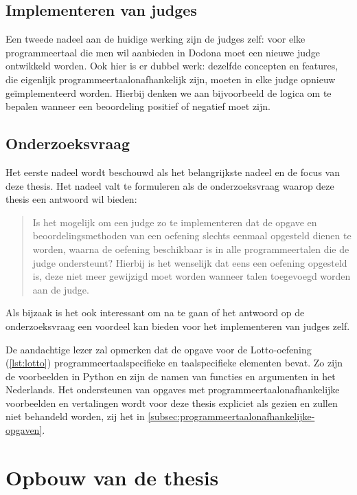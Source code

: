 \subsection{Implementeren van judges}\label{subsec:implementeren-van-judges}

Een tweede nadeel aan de huidige werking zijn de judges zelf: voor elke programmeertaal die men wil aanbieden in Dodona moet een nieuwe judge ontwikkeld worden.
Ook hier is er dubbel werk: dezelfde concepten en features, die eigenlijk programmeertaalonafhankelijk zijn, moeten in elke judge opnieuw geïmplementeerd worden.
Hierbij denken we aan bijvoorbeeld de logica om te bepalen wanneer een beoordeling positief of negatief moet zijn.

\subsection{Onderzoeksvraag}\label{subsec:onderzoeksvraag}

Het eerste nadeel wordt beschouwd als het belangrijkste nadeel en de focus van deze thesis.
Het nadeel valt te formuleren als de onderzoeksvraag waarop deze thesis een antwoord wil bieden:

\begin{quote}
    Is het mogelijk om een judge zo te implementeren dat de opgave en beoordelingsmethoden van een oefening slechts eenmaal opgesteld dienen te worden, waarna de oefening beschikbaar is in alle programmeertalen die de judge ondersteunt?
    Hierbij is het wenselijk dat eens een oefening opgesteld is, deze niet meer gewijzigd moet worden wanneer talen toegevoegd worden aan de judge.
\end{quote}

Als bijzaak is het ook interessant om na te gaan of het antwoord op de onderzoeksvraag een voordeel kan bieden voor het implementeren van judges zelf.

De aandachtige lezer zal opmerken dat de opgave voor de Lotto-oefening (\cref{lst:lotto}) programmeertaalspecifieke en taalspecifieke elementen bevat.
Zo zijn de voorbeelden in Python en zijn de namen van functies en argumenten in het Nederlands.
Het ondersteunen van opgaves met programmeertaalonafhankelijke voorbeelden en vertalingen wordt voor deze thesis expliciet als  gezien en zullen niet behandeld worden, zij het in \cref{subsec:programmeertaalonafhankelijke-opgaven}.

\section{Opbouw van de thesis}\label{sec:opbouw}

